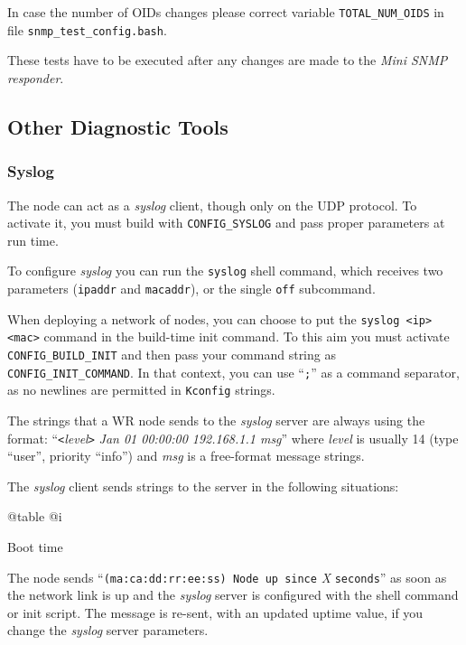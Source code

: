 \documentclass[a4paper, 12pt]{article}
\begin{document}
In case the number of OIDs changes please correct variable \texttt{TOTAL\_NUM\_OIDS}
in file \texttt{snmp\_test\_config.bash}.

These tests have to be executed after any changes are made to the \textit{Mini SNMP
responder}.

\label{Other Diagnostic Tools}
\subsection{Other Diagnostic Tools}

\label{Syslog}
\subsubsection{Syslog}

The node can act as a \textit{syslog} client, though only on the UDP protocol.
To activate it, you must build with \texttt{CONFIG\_SYSLOG} and pass proper
parameters at run time.

To configure \textit{syslog} you can run the \texttt{syslog} shell command, which
receives two parameters (\texttt{ipaddr} and \texttt{macaddr}), or the
single \texttt{off} subcommand.

When deploying a network of nodes, you can choose to put the \texttt{syslog
<ip> <mac>} command in the build-time init command. To this aim you
must activate \texttt{CONFIG\_BUILD\_INIT} and then pass your command string
as \texttt{CONFIG\_INIT\_COMMAND}.  In that context, you can use ``\texttt{;}'' as
a command separator, as no newlines are permitted in \texttt{Kconfig}
strings.

The strings that a WR node sends to the \textit{syslog} server are always
using the format:  ``\texttt{<}\textit{level}\texttt{>} \textit{Jan 01 00:00:00 192.168.1.1 msg}''
where \textit{level} is usually 14 (type ``user'', priority ``info'')
and \textit{msg} is a free-format message strings.

The \textit{syslog} client sends strings to the server in the following
situations:

@table @i

\item Boot time

	The node sends ``\texttt{(ma:ca:dd:rr:ee:ss) Node up since} \textit{X}
        \texttt{seconds}'' as soon as the network link is up and the \textit{syslog}
        server is configured with the shell command or init script.
        The message is re-sent, with an updated uptime value, if you change
        the \textit{syslog} server parameters.
\end{document}
